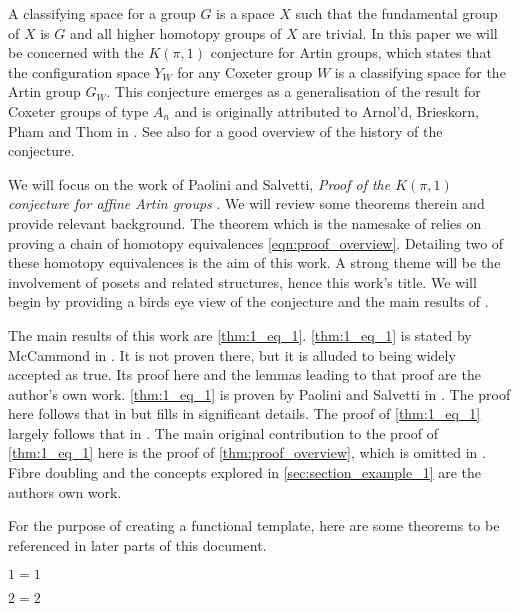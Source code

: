 A classifying space for a group \(G\) is a space \(X\) such that the fundamental group of \(X\) is \(G\) and all higher homotopy groups of $X$ are trivial.
In this paper we will be concerned with the $K(\pi,1)$ conjecture for Artin groups, which states that the configuration space $Y_W$ for any Coxeter group $W$ is a classifying space for the Artin group $G_W$.  This conjecture emerges as a generalisation of the result for Coxeter groups of type $A_n$ and is originally attributed to Arnol'd, Brieskorn, Pham and Thom in \cite{paris_kpi1_2014}. See also \cite{charney_davis_pi_1995} for a good overview of the history of the conjecture.

We will focus on the work of Paolini and Salvetti, \emph{Proof of the \(K(\pi, 1)\) conjecture for affine Artin groups} \cite{paolini_salvetti_kpi1_2021}. We will review some theorems therein and provide relevant background. The theorem which is the namesake of \cite{paolini_salvetti_kpi1_2021} relies on proving a chain of homotopy equivalences \eqref{eqn:proof_overview}. Detailing two of these homotopy equivalences is the aim of this work. A strong theme will be the involvement of posets and related structures, hence this work's title. We will begin by providing a birds eye view of the conjecture and the  main results of \cite{paolini_salvetti_kpi1_2021}.

The main results of this work are \cref{thm:1_eq_1}.
\cref{thm:1_eq_1} is stated by McCammond in \cite{mccammond_introduction_2005}. It is not proven there, but it is alluded to being widely accepted as true. Its proof here and the lemmas leading to that proof are the author's own work.
\cref{thm:1_eq_1} is proven by Paolini and Salvetti in \cite{paolini_salvetti_kpi1_2021}. The proof here follows that in \cite{paolini_salvetti_kpi1_2021} but fills in significant details.
The proof of \cref{thm:1_eq_1} largely follows that in \cite{paolini_salvetti_kpi1_2021}. The main original contribution to the proof of \cref{thm:1_eq_1} here is the proof of \cref{thm:proof_overview}, which is omitted in \cite{paolini_salvetti_kpi1_2021}.
Fibre doubling and the concepts explored in \cref{sec:section_example_1} are the authors own work.

For the purpose of creating a functional template, here are some theorems to be referenced in later parts of this document.

\begin{theorem}
	\label{thm:1_eq_1}
	\(1=1\)
\end{theorem}
\begin{theorem}
	\label{thm:2_eq_2}
	\(2=2\)
\end{theorem}
